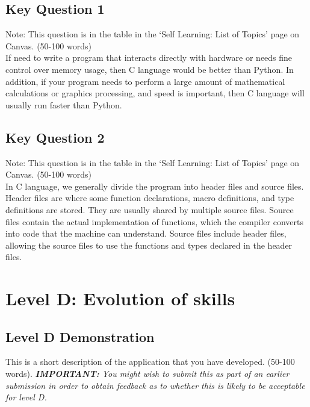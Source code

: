 \documentclass[a4paper, 11pt]{report}
\begin{document}
\subsection{Key Question 1}
Note: This question is in the table in the ‘Self Learning: List of Topics’ page on Canvas. (50-100 words)\\

If need to write a program that interacts directly with hardware or needs fine control over memory usage, then C language would be better than Python. In addition, if your program needs to perform a large amount of mathematical calculations or graphics processing, and speed is important, then C language will usually run faster than Python.\\

\subsection{Key Question 2}
Note: This question is in the table in the ‘Self Learning: List of Topics’ page on Canvas. (50-100 words)\\

In C language, we generally divide the program into header files and source files. Header files are where some function declarations, macro definitions, and type definitions are stored. They are usually shared by multiple source files. Source files contain the actual implementation of functions, which the compiler converts into code that the machine can understand. Source files include header files, allowing the source files to use the functions and types declared in the header files.\\



\newpage
\section{Level D: Evolution of skills}
\vspace{5mm}
\subsection{Level D Demonstration}

This is a short description of the application that you have developed. (50-100 words).
\textit{{\bf IMPORTANT:} You might wish to submit this as part of an earlier submission in order to obtain feedback as to whether this is likely to be acceptable for level D.}
\end{document}
